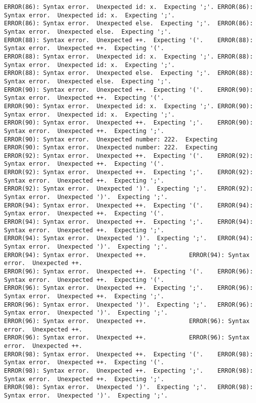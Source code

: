 \documentclass[12pt]{book}
\begin{document}
\begin{lstlisting}
ERROR(86): Syntax error.  Unexpected id: x.  Expecting ';'.	ERROR(86): Syntax error.  Unexpected id: x.  Expecting ';'.
ERROR(86): Syntax error.  Unexpected else.  Expecting ';'.	ERROR(86): Syntax error.  Unexpected else.  Expecting ';'.
ERROR(88): Syntax error.  Unexpected ++.  Expecting '('.	ERROR(88): Syntax error.  Unexpected ++.  Expecting '('.
ERROR(88): Syntax error.  Unexpected id: x.  Expecting ';'.	ERROR(88): Syntax error.  Unexpected id: x.  Expecting ';'.
ERROR(88): Syntax error.  Unexpected else.  Expecting ';'.	ERROR(88): Syntax error.  Unexpected else.  Expecting ';'.
ERROR(90): Syntax error.  Unexpected ++.  Expecting '('.	ERROR(90): Syntax error.  Unexpected ++.  Expecting '('.
ERROR(90): Syntax error.  Unexpected id: x.  Expecting ';'.	ERROR(90): Syntax error.  Unexpected id: x.  Expecting ';'.
ERROR(90): Syntax error.  Unexpected ++.  Expecting ';'.	ERROR(90): Syntax error.  Unexpected ++.  Expecting ';'.
ERROR(90): Syntax error.  Unexpected number: 222.  Expecting 	ERROR(90): Syntax error.  Unexpected number: 222.  Expecting 
ERROR(92): Syntax error.  Unexpected ++.  Expecting '('.	ERROR(92): Syntax error.  Unexpected ++.  Expecting '('.
ERROR(92): Syntax error.  Unexpected ++.  Expecting ';'.	ERROR(92): Syntax error.  Unexpected ++.  Expecting ';'.
ERROR(92): Syntax error.  Unexpected ')'.  Expecting ';'.	ERROR(92): Syntax error.  Unexpected ')'.  Expecting ';'.
ERROR(94): Syntax error.  Unexpected ++.  Expecting '('.	ERROR(94): Syntax error.  Unexpected ++.  Expecting '('.
ERROR(94): Syntax error.  Unexpected ++.  Expecting ';'.	ERROR(94): Syntax error.  Unexpected ++.  Expecting ';'.
ERROR(94): Syntax error.  Unexpected ')'.  Expecting ';'.	ERROR(94): Syntax error.  Unexpected ')'.  Expecting ';'.
ERROR(94): Syntax error.  Unexpected ++.			ERROR(94): Syntax error.  Unexpected ++.
ERROR(96): Syntax error.  Unexpected ++.  Expecting '('.	ERROR(96): Syntax error.  Unexpected ++.  Expecting '('.
ERROR(96): Syntax error.  Unexpected ++.  Expecting ';'.	ERROR(96): Syntax error.  Unexpected ++.  Expecting ';'.
ERROR(96): Syntax error.  Unexpected ')'.  Expecting ';'.	ERROR(96): Syntax error.  Unexpected ')'.  Expecting ';'.
ERROR(96): Syntax error.  Unexpected ++.			ERROR(96): Syntax error.  Unexpected ++.
ERROR(96): Syntax error.  Unexpected ++.			ERROR(96): Syntax error.  Unexpected ++.
ERROR(98): Syntax error.  Unexpected ++.  Expecting '('.	ERROR(98): Syntax error.  Unexpected ++.  Expecting '('.
ERROR(98): Syntax error.  Unexpected ++.  Expecting ';'.	ERROR(98): Syntax error.  Unexpected ++.  Expecting ';'.
ERROR(98): Syntax error.  Unexpected ')'.  Expecting ';'.	ERROR(98): Syntax error.  Unexpected ')'.  Expecting ';'.

\end{lstlisting}
\end{document}
